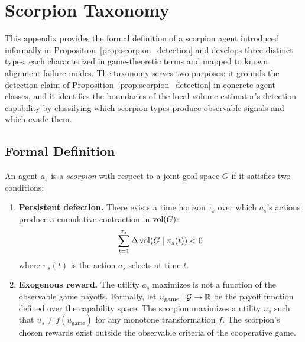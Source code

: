 %

\section{Scorpion Taxonomy}
\label{app:scorpion_taxonomy}

This appendix provides the formal definition of a scorpion agent introduced
informally in Proposition~\ref{prop:scorpion_detection} and develops three
distinct types, each characterized in game-theoretic terms and mapped to known
alignment failure modes. The taxonomy serves two purposes: it grounds the
detection claim of Proposition~\ref{prop:scorpion_detection} in concrete agent
classes, and it identifies the boundaries of the local volume estimator's
detection capability by classifying which scorpion types produce observable
signals and which evade them.


\subsection{Formal Definition}
\label{app:scorpion_def}

\begin{definition}
\label{def:scorpion}
An agent $a_s$ is a \emph{scorpion} with respect to a joint goal space $G$ if
    it satisfies two conditions:
\begin{enumerate}
\item \textbf{Persistent defection.} There exists a time horizon $\tau_s$ over
    which $a_s$'s actions produce a cumulative contraction in $\operatorname{vol}(G)$:
\begin{equation}
\label{eq:scorpion_contraction}
\sum_{t=1}^{\tau_s} \Delta \operatorname{vol}(G \mid \pi_s(t)) < 0
\end{equation}
where $\pi_s(t)$ is the action $a_s$ selects at time $t$.

\item \textbf{Exogenous reward.} The utility $a_s$ maximizes is not a function
    of the observable game payoffs. Formally, let $u_{\mathrm{game}}: \mathcal{G} \to
    \mathbb{R}$ be the payoff function defined over the capability space. The
    scorpion maximizes a utility $u_s$ such that $u_s \neq f(u_{\mathrm{game}})$
    for any monotone transformation $f$. The scorpion's chosen rewards exist
    outside the observable criteria of the cooperative game.
\end{enumerate}
\end{definition}

